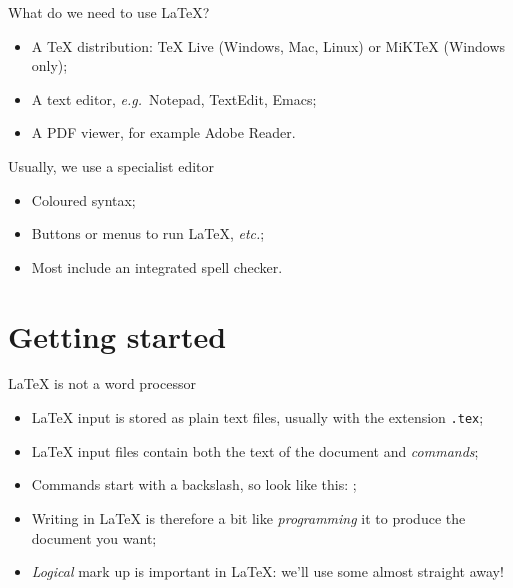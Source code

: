 \begin{frame}{What do we need to use \LaTeX{}?}

  \begin{itemize}
    \item A \TeX{} distribution: \TeX{} Live (Windows, Mac, Linux) or
      MiK\TeX{} (Windows only);
    \item A text editor, \emph{e.g.}~Notepad, TextEdit, Emacs;
    \item A PDF viewer, for example Adobe Reader.
  \end{itemize}

  \pause
  
  Usually, we use a specialist editor
  \begin{itemize}
    \item Coloured syntax;
    \item Buttons or menus to run \LaTeX{}, \emph{etc.};
    \item Most include an integrated spell checker.
  \end{itemize}
\end{frame}


\section{Getting started}

\begin{frame}{\LaTeX{} is not a word processor}

  \begin{itemize}
    \item \LaTeX{} input is stored as plain text files, usually with
      the extension \texttt{.tex};
    \item \LaTeX{} input files contain both the text of the document
      and \emph{commands};
    \item Commands start with a backslash, so look like this:
      ;
    \item Writing in \LaTeX{} is therefore a bit like \emph{programming}
      it to produce the document you want;
    \item \emph{Logical} mark up is important in \LaTeX{}: we'll use some
      almost straight away!
  \end{itemize}

\end{frame}

